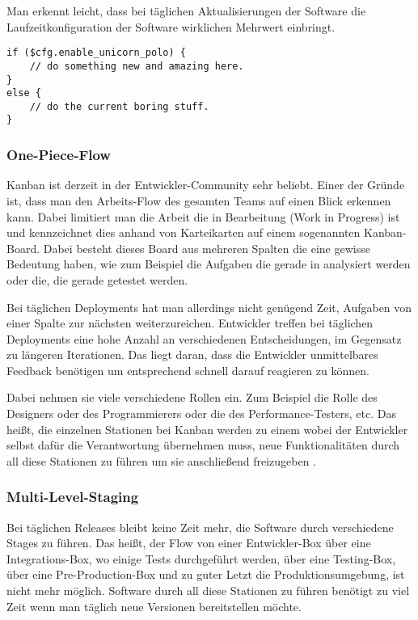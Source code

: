 Man erkennt leicht, dass bei täglichen Aktualisierungen der Software die Laufzeitkonfiguration der Software wirklichen Mehrwert einbringt.

\begin{lstlisting}[float=h!tb,caption=Beispiel eines Feature Flags bei Flickr \cite{flickr09}, label=fflagcode]
if ($cfg.enable_unicorn_polo) {
    // do something new and amazing here.
}
else {
    // do the current boring stuff.
}
\end{lstlisting}

\subsubsection{One-Piece-Flow}
Kanban ist derzeit in der Entwickler-Community sehr beliebt. Einer der Gründe ist, dass man den Arbeits-Flow des gesamten Teams auf einen Blick erkennen kann. Dabei limitiert man die Arbeit die in Bearbeitung (Work in Progress) ist und kennzeichnet dies anhand von Karteikarten auf einem sogenannten Kanban-Board. Dabei besteht dieses Board aus mehreren Spalten die eine gewisse Bedeutung haben, wie zum Beispiel die Aufgaben die gerade in analysiert werden oder die, die gerade getestet werden. 

Bei täglichen Deployments hat man allerdings nicht genügend Zeit, Aufgaben von einer Spalte zur nächsten weiterzureichen. Entwickler treffen bei täglichen Deployments eine hohe Anzahl an verschiedenen Entscheidungen, im Gegensatz zu längeren Iterationen. Das liegt daran, dass die Entwickler unmittelbares Feedback benötigen um entsprechend schnell darauf reagieren zu können.

Dabei nehmen sie viele verschiedene Rollen ein. Zum Beispiel die Rolle des Designers oder des Programmierers oder die des Performance-Testers, etc. Das heißt, die einzelnen Stationen bei Kanban werden zu einem  wobei der Entwickler selbst dafür die Verantwortung übernehmen muss, neue Funktionalitäten durch all diese Stationen zu führen um sie anschließend freizugeben \cite{sutherland2011}.

\subsubsection{Multi-Level-Staging}
Bei täglichen Releases bleibt keine Zeit mehr, die Software durch verschiedene Stages zu führen. Das heißt, der Flow von einer Entwickler-Box über eine Integrations-Box, wo einige Tests durchgeführt werden, über eine Testing-Box, über eine Pre-Production-Box und zu guter Letzt die Produktionsumgebung, ist nicht mehr möglich. Software durch all diese Stationen zu führen benötigt zu viel Zeit wenn man täglich neue Versionen bereitstellen möchte. 

